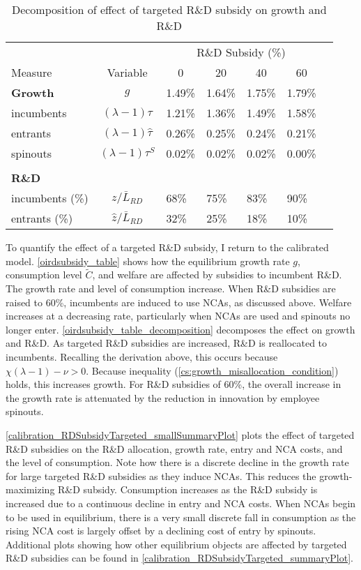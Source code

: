 \documentclass[11pt,english]{article}
\theoremstyle{definition}
\begin{document}
\begin{table}
	\centering
	\caption{Decomposition of effect of targeted R\&D subsidy on growth and R\&D}\label{oirdsubsidy_table_decomposition}
	\begin{tabular}{lclllll}
		\toprule \toprule
		&  & \multicolumn{4}{c}{R\&D Subsidy (\%)} \vspace{3pt} \tabularnewline
		Measure & Variable & \multicolumn{1}{c}{0} & \multicolumn{1}{c}{20} & \multicolumn{1}{c}{40} & \multicolumn{1}{c}{60}\tabularnewline
		\midrule
		\textbf{Growth} & $g$ & 1.49\% & 1.64\% & 1.75\% & 1.79\% 
		\tabularnewline
		\multicolumn{1}{l}{\quad incumbents} & $(\lambda -1) \tau$ & 1.21\% & 1.36\% & 1.49\% & 1.58\% \tabularnewline
		\multicolumn{1}{l}{\quad entrants} & $(\lambda - 1) \hat{\tau}$ & 0.26\% & 0.25\% & 0.24\% & 0.21\% \tabularnewline
		\multicolumn{1}{l}{\quad spinouts} & $(\lambda - 1) \tau^S$ & 0.02\% & 0.02\% & 0.02\% & 0.00\% \tabularnewline \tabularnewline
		\textbf{R\&D} & &  &  &  & \tabularnewline
		\multicolumn{1}{l}{\quad incumbents (\%)} & $z / \bar{L}_{RD}$ & 68\% & 75\% & 83\% & 90\% \tabularnewline
		\multicolumn{1}{l}{\quad entrants (\%)} & $\hat{z} / \bar{L}_{RD}$ & 32\% & 25\% & 18\% & 10\% \tabularnewline
		\bottomrule
	\end{tabular}
\end{table}

To quantify the effect of a targeted R\&D subsidy, I return to the calibrated model. \autoref{oirdsubsidy_table} shows how the equilibrium growth rate $g$, consumption level $\tilde{C}$, and welfare are affected by subsidies to incumbent R\&D. The growth rate and level of consumption increase. When R\&D subsidies are raised to 60\%, incumbents are induced to use NCAs, as discussed above. Welfare increases at a decreasing rate, particularly when NCAs are used and spinouts no longer enter. \autoref{oirdsubsidy_table_decomposition} decomposes the effect on growth and R\&D. As targeted R\&D subsidies are increased, R\&D is reallocated to incumbents. Recalling the derivation above, this occurs because $\chi(\lambda -1 ) - \nu > 0$. Because inequality (\ref{cs:growth_misallocation_condition}) holds, this increases growth. For R\&D subsidies of 60\%, the overall increase in the growth rate is attenuated by the reduction in innovation by employee spinouts. 

\autoref{calibration_RDSubsidyTargeted_smallSummaryPlot} plots the effect of targeted R\&D subsidies on the R\&D allocation, growth rate, entry and NCA costs, and the level of consumption. Note how there is a discrete decline in the growth rate for large targeted R\&D subsidies as they induce NCAs. This reduces the growth-maximizing R\&D subsidy. Consumption increases as the R\&D subsidy is increased due to a continuous decline in entry and NCA costs. When NCAs begin to be used in equilibrium, there is a very small discrete fall in consumption as the rising NCA cost is largely offset by a declining cost of entry by spinouts. Additional plots showing how other equilibrium objects are affected by targeted R\&D subsidies can be found in \autoref{calibration_RDSubsidyTargeted_summaryPlot}.
\end{document}
